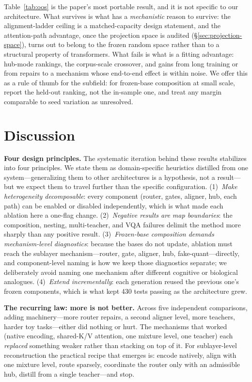 \documentclass[10pt,twoside]{article}
\theoremstyle{definition}
\theoremstyle{plain}
\theoremstyle{remark}
\begin{document}
Table~\ref{tab:oos} is the paper's most portable result, and it is not specific to our architecture. What survives is what has a \emph{mechanistic} reason to survive: the alignment-ladder ceiling is a matched-capacity design statement, and the attention-path advantage, once the projection space is audited (\S\ref{sec:projection-space}), turns out to belong to the frozen random space rather than to a structural property of transformers. What fails is what is a fitting advantage: hub-mode rankings, the corpus-scale crossover, and gains from long training or from repairs to a mechanism whose end-to-end effect is within noise. We offer this as a rule of thumb for the subfield: for frozen-base composition at small scale, report the held-out ranking, not the in-sample one, and treat any margin comparable to seed variation as unresolved.

\section{Discussion}
\label{sec:discussion}

\textbf{Four design principles.} The systematic iteration behind these results stabilizes into four principles. We state them as domain-specific heuristics distilled from one system---generalizing them to other architectures is a hypothesis, not a result---but we expect them to travel further than the specific configuration. (1)~\emph{Make heterogeneity decomposable}: every component (router, gates, aligner, hub, each path) can be enabled or disabled independently, which is what made each ablation here a one-flag change. (2)~\emph{Negative results are map boundaries}: the composition, nesting, multi-teacher, and VQA failures delimit the method more sharply than any positive result. (3)~\emph{Frozen-base composition demands mechanism-level diagnostics}: because the bases do not update, ablation must reach the sublayer mechanism---router, gate, aligner, hub, fake-quant---directly, and component-level naming is how we keep those diagnostics separate; we deliberately avoid naming one mechanism after different cognitive or biological analogues. (4)~\emph{Extend incrementally}: each generation reused the previous one's frozen components, which is what kept 430 tests passing as the architecture grew.

\textbf{The recurring law: more is not better.} Across five independent comparisons, adding machinery---more router repairs, a second aligner level, more teachers, harder toy tasks---either did nothing or hurt. The mechanisms that worked (native encoding, shared-K/V attention, one mixture level, one teacher) each \emph{replaced} something weaker rather than stacking on top of it. For sublayer-level reconstruction the practical recipe that emerges is: encode natively, align with one mixture level, route sparsely, coordinate the router only with an admissible hub, distill from a single teacher---and stop.
\end{document}
